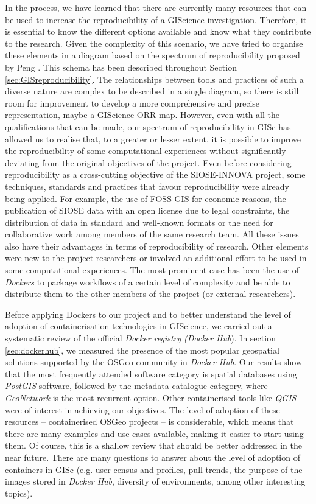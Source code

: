 \documentclass[ijgi,article,submit,moreauthors,pdftex]{Definitions/mdpi}
\begin{document}
In the process, we have learned that there are currently many resources that can be used to increase the reproducibility of a GIScience investigation. Therefore, it is essential to know the different options available and know what they contribute to the research. Given the complexity of this scenario, we have tried to organise these elements in a diagram based on the spectrum of reproducibility proposed by Peng \cite{peng2011reproducible}. This schema has been described throughout Section \ref{sec:GISreproducibility}. The relationships between tools and practices of such a diverse nature are complex to be described in a single diagram, so there is still room for improvement to develop a more comprehensive and precise representation, maybe a GIScience ORR map. However, even with all the qualifications that can be made, our spectrum of reproducibility in GISc has allowed us to realise that, to a greater or lesser extent, it is possible to improve the reproducibility of some computational experiences without significantly deviating from the original objectives of the project. Even before considering reproducibility as a cross-cutting objective of the SIOSE-INNOVA project, some techniques, standards and practices that favour reproducibility were already being applied. For example, the use of FOSS GIS for economic reasons, the publication of SIOSE data with an open license due to legal constraints, the distribution of data in standard and well-known formats or the need for collaborative work among members of the same research team. All these issues also have their advantages in terms of reproducibility of research. Other elements were new to the project researchers or involved an additional effort to be used in some computational experiences. The most prominent case has been the use of \textit{Dockers} to package workflows of a certain level of complexity and be able to distribute them to the other members of the project (or external researchers).

Before applying Dockers to our project and to better understand the level of adoption of containerisation technologies in GIScience, we carried out a systematic review of the official \textit{Docker registry} \textit{(Docker Hub}). In section \ref{sec:dockerhub}, we measured the presence of the most popular geospatial solutions supported by the OSGeo community in \textit{Docker Hub}. Our results show that the most frequently attended software category is spatial databases using \textit{PostGIS} software, followed by the metadata catalogue category, where \textit{GeoNetwork} is the most recurrent option. Other containerised tools like \textit{QGIS} were of interest in achieving our objectives. The level of adoption of these resources -- containerised OSGeo projects -- is considerable, which means that there are many examples and use cases available, making it easier to start using them. Of course, this is a shallow review that should be better addressed in the near future. There are many questions to answer about the level of adoption of containers in GISc (e.g. user census and profiles, pull trends, the purpose of the images stored in \textit{Docker Hub}, diversity of environments, among other interesting topics).
\end{document}
